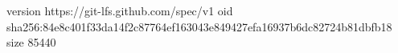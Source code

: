 version https://git-lfs.github.com/spec/v1
oid sha256:84e8c401f33da14f2c87764ef163043e849427efa16937b6dc82724b81dbfb18
size 85440

